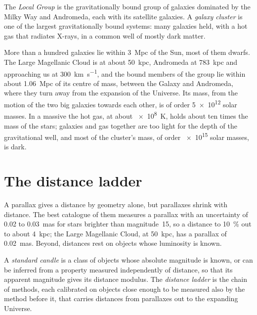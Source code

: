 \begin{definition}\label{def:b3:milky-way-galaxies:groups}
The \emph{Local Group} is the gravitationally bound
group of galaxies dominated by the Milky Way and Andromeda, each with
its satellite galaxies. A \emph{galaxy cluster} is
one of the largest gravitationally bound systems: many galaxies held,
with a hot gas that radiates X-rays, in a common well of mostly dark
matter.
\end{definition}

More than a hundred galaxies lie within \qty{3}{Mpc} of the Sun, most of
them dwarfs. The Large Magellanic Cloud is at about \qty{50}{kpc}, Andromeda at
\qty{783}{kpc} and approaching us at \qty{300}{km.s^{-1}}, and the bound
members of the group lie within about \qty{1.06}{Mpc} of its centre of
mass, between the Galaxy and Andromeda, where they turn away from the
expansion of the Universe. Its mass, from the motion of the two big
galaxies towards each other, is of order \num{5e12} solar masses. In a
massive  the hot gas, at about \qty{e8}{K}, holds about ten
times the mass of the stars; galaxies and gas together are too light for
the depth of the gravitational well, and most of the cluster's mass,
of order \num{e15} solar masses, is dark.

\section{The distance ladder}\label{sec:b3:milky-way-galaxies:ladder}

A parallax gives a distance by geometry alone, but parallaxes shrink with
distance. The best catalogue of them measures a parallax with an
uncertainty of 0.02 to \qty{0.03}{mas} for stars brighter than
magnitude~15, so a distance to \qty{10}{\percent} out to about
\qty{4}{kpc}; the Large Magellanic Cloud, at \qty{50}{kpc}, has a
parallax of \qty{0.02}{mas}. Beyond, distances rest on objects whose
luminosity is known.

\begin{definition}\label{def:b3:milky-way-galaxies:ladder}
A \emph{standard candle} is a class of objects
whose absolute magnitude is known, or can be inferred from a property
measured independently of distance, so that its apparent magnitude gives
its distance modulus. The \emph{distance ladder} is
the chain of methods, each calibrated on objects close enough to be
measured also by the method before it, that carries distances from
parallaxes out to the expanding Universe.
\end{definition}

